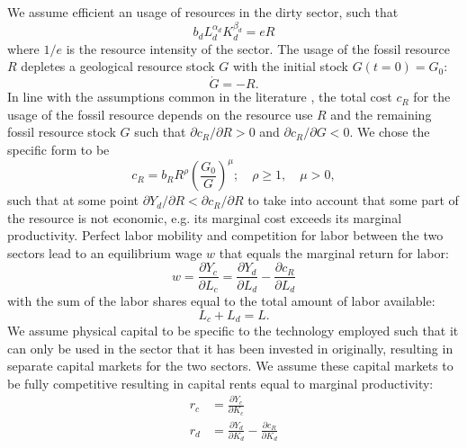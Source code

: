 We assume efficient an usage of resources in the dirty sector, such that
\begin{equation}
    b_d L_d^{\alpha_d}K_d^{\beta_d} = e R
    \label{eq:efficient_dirty_resources}
\end{equation}
where $1/e$ is the resource intensity of the sector. The usage of the fossil resource $R$ depletes a geological resource stock $G$ with the initial stock $G(t=0) = G_0$:
\begin{equation}
    \dot{G} = -R. 
    \label{eq:resource_depletion}
\end{equation} 
In line with the assumptions common in the literature \cite{Dasgupta1974, Perman2003}, the total cost $c_R$ for the usage of the fossil resource depends on the resource use $R$ and the remaining fossil resource stock $G$ such that $\partial c_R / \partial R >0$ and $\partial c_R / \partial G < 0$. We chose the specific form to be
\begin{equation}
	c_R = b_R R^{\rho}\left( \frac{G_0}{G} \right)^{\mu}; \quad \rho \geq 1, \quad \mu > 0,
	\label{eq:resource_cost}
\end{equation}
such that at some point $\partial Y_d / \partial R < \partial c_R / \partial R$ to take into account that some part of the resource is not economic, e.g. its marginal cost exceeds its marginal productivity.
Perfect labor mobility and competition for labor between the two sectors lead to an equilibrium wage $w$ that equals the marginal return for labor:
\begin{equation}
	w = \frac{\partial Y_c}{\partial L_c} = \frac{\partial Y_d}{\partial L_d} - \frac{\partial c_R}{\partial L_d}
	\label{eq:equilibrium_wage}
\end{equation}
with the sum of the labor shares equal to the total amount of labor available:
\begin{equation}
	L_c + L_d = L.
	\label{eq:population}
\end{equation}
We assume physical capital to be specific to the technology employed such that it can only be used in the sector that it has been invested in originally, resulting in separate capital markets for the two sectors. We assume these capital markets to be fully competitive resulting in capital rents equal to marginal productivity:
\begin{align}
	r_c &= \frac{\partial Y_c}{\partial K_c} \label{eq:clean_capital_rent}\\
	r_d &= \frac{\partial Y_d}{\partial K_d} - \frac{\partial c_R}{\partial K_d} \label{eq:dirty_capital_rent}
\end{align}

